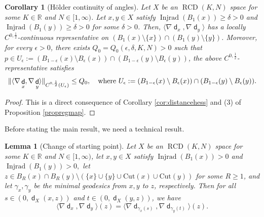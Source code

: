 \documentclass[11pt,reqno]{amsart}
\newtheorem{lemma}[theorem]{Lemma}
\newtheorem{corollary}[theorem]{Corollary}
\theoremstyle{definition}
\numberwithin{equation}{section}
\DeclareMathOperator{\dist}{\mathsf{d}}
\DeclareMathOperator{\Injrad}{Injrad}
\DeclareMathOperator{\RCD}{RCD}
\begin{document}
\begin{corollary}[H\"older continuity of angles]\label{holdercontiangle}
    Let $X$ be an $\RCD(K, N)$ space for some $K \in \mathbb{R}$ and $N \in [1, \infty)$. Let $x, y \in X$ satisfy
$
\Injrad(B_{1}(x))\ge \delta>0$ and $\Injrad(B_{1}(y)) \ge \delta>0
$
for some $\delta > 0$.
Then, 
$\langle \nabla\dist_x, \nabla\dist_y\rangle$ has a locally $C^{0,\frac{1}{2}}$-continuous representative on $(B_1(x) \setminus \{x\}) \cap (B_1(y) \setminus \{y\})$. Moreover, for every $\epsilon > 0$, there exists $Q_0 = Q_0 (\epsilon, \delta, K, N) > 0$ such that $p \in U_{\epsilon} := (B_{1-\epsilon}(x) \setminus B_{\epsilon}(x) ) \cap (B_{1-\epsilon}(y) \setminus B_{\epsilon}(y) )$,  the above  $C^{0,\frac{1}{2}}$-representative satisfies 
\begin{align}\label{e:quantitative-C^{1/2}-Hoelder}
\|\langle \nabla\dist_x, \nabla\dist_y\rangle\|_{C^{0,\frac{1}{2}}(U_{\epsilon})} \leq Q_0, \quad \text{where $U_{\epsilon}:=(B_{1-\epsilon}(x) \setminus B_{\epsilon}(x) ) \cap (B_{1-\epsilon}(y) \setminus B_{\epsilon}(y))$.} 
\end{align}
\end{corollary}
\begin{proof}
This is a direct consequence of Corollary \ref{cor:distancehess} and (3) of Proposition \ref{propregmap}.
\end{proof}
Before stating the main result, we need a  technical result.
\begin{lemma}[Change of starting point]\label{s9asasnrknnvkst}
Let $X$ be an $\RCD(K, N)$ space for some $K \in \mathbb{R}$ and $N \in [1, \infty)$, let $x, y \in X$ satisfy
$
    \Injrad(B_1(x))>0$ and $
    \Injrad (B_1(y))>0,
$
let $z \in B_{R}(x) \cap B_{R}(y) \setminus (\{x\} \cup  \{y\}\cup \mathrm{Cut}(x)\cup \mathrm{Cut}(y))$ for some $R \ge 1$, and let $\gamma_x, \gamma_y$ be the minimal geodesics from $x, y$ to $z$, respectively.
Then for all $s \in (0, \dist_X(x,z))$ and $t \in (0, \dist_X(y,z))$, 
we have
\begin{equation}\label{asioajsransrasln}
    \langle \nabla \dist_x, \nabla \dist_y\rangle (z) = \langle \nabla \dist_{\gamma_x(s)}, \nabla \dist_{\gamma_y(t)}\rangle(z).
\end{equation}
\end{lemma}
\end{document}
